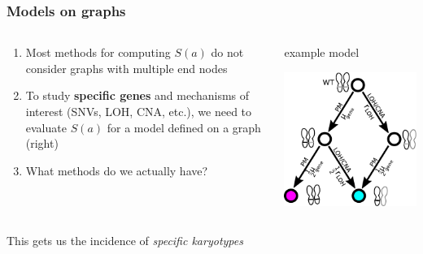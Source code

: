 \documentclass{beamer}
\begin{document}
\begin{frame}
    \frametitle{Models on graphs}
    \begin{columns}
        \begin{column}{0.5\textwidth}
        \begin{enumerate}
            \item Most methods for computing $S(a)$ do not consider graphs with
            multiple end nodes
            \item To study \textbf{specific genes} and mechanisms of interest
            (SNVs, LOH, CNA, etc.), we need to evaluate $S(a)$ for a model
            defined on a graph (right)
            \item What methods do we actually have?
        \end{enumerate}
        \end{column}
        \begin{column}{0.5\textwidth}
        \begin{center}
            \small{example model}
        \end{center}
            \includegraphics[width=\textwidth]{figures/diagram4}
        \end{column}
    \end{columns}

    \;

    \begin{center}
        This gets us the incidence of \emph{specific karyotypes}
    \end{center}
\end{frame}
\end{document}
